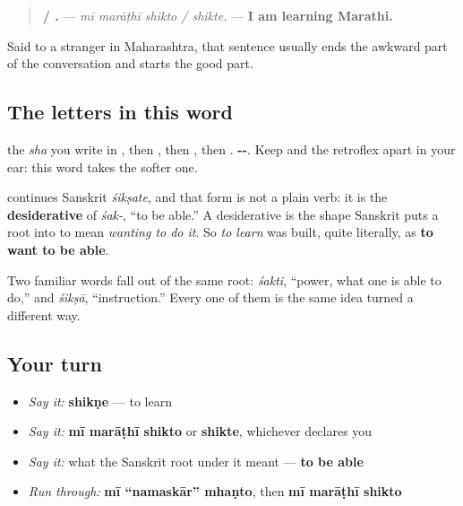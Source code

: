 \begin{quote}
\textbf{   / .} — \emph{mī marāṭhī shikto / shikte.} — \textbf{I am learning Marathi.}
\end{quote}

Said to a stranger in Maharashtra, that sentence usually ends the awkward part of the conversation and starts the good part.

\subsection*{The letters in this word}
\textbf{} the \emph{sha} you write in \textbf{}, then \textbf{}, then \textbf{}, then \textbf{}. \textbf{--}. Keep \textbf{} and the retroflex \textbf{} apart in your ear: this word takes the softer one.

\begin{cousinweb}
\textbf{} continues Sanskrit \textbf{} \emph{śikṣate}, and that form is not a plain verb: it is the \textbf{desiderative} of \textbf{} \emph{śak-}, \textquotedblleft{}to be able.\textquotedblright{} A desiderative is the shape Sanskrit puts a root into to mean \emph{wanting to do it}. So \emph{to learn} was built, quite literally, as \textbf{to want to be able}.

Two familiar words fall out of the same root: \textbf{} \emph{śakti}, \textquotedblleft{}power, what one is able to do,\textquotedblright{} and \textbf{} \emph{śikṣā}, \textquotedblleft{}instruction.\textquotedblright{} Every one of them is the same idea turned a different way.
\end{cousinweb}

\subsection*{Your turn}
\begin{itemize}
\raggedright
  \item \emph{Say it:} \textbf{shikṇe} — to learn
  \item \emph{Say it:} \textbf{mī marāṭhī shikto} or \textbf{shikte}, whichever declares you
  \item \emph{Say it:} what the Sanskrit root under it meant — \textbf{to be able}
  \item \emph{Run through:} \textbf{mī \textquotedblleft{}namaskār\textquotedblright{} mhaṇto}, then \textbf{mī marāṭhī shikto}
\end{itemize}

